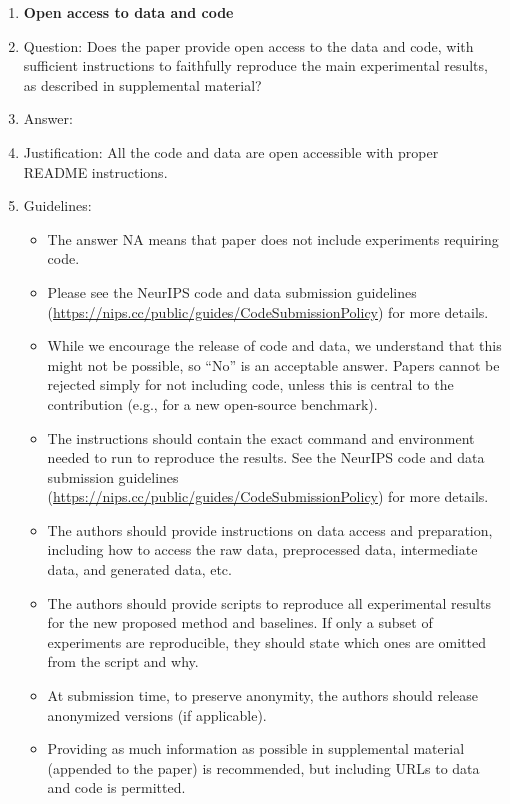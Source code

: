 \begin{enumerate}
\item {\bf Open access to data and code}
    \item[] Question: Does the paper provide open access to the data and code, with sufficient instructions to faithfully reproduce the main experimental results, as described in supplemental material?
    \item[] Answer: \answerYes{} %
    \item[] Justification: All the code and data are open accessible with proper README instructions.
    \item[] Guidelines:
    \begin{itemize}
        \item The answer NA means that paper does not include experiments requiring code.
        \item Please see the NeurIPS code and data submission guidelines (\url{https://nips.cc/public/guides/CodeSubmissionPolicy}) for more details.
        \item While we encourage the release of code and data, we understand that this might not be possible, so “No” is an acceptable answer. Papers cannot be rejected simply for not including code, unless this is central to the contribution (e.g., for a new open-source benchmark).
        \item The instructions should contain the exact command and environment needed to run to reproduce the results. See the NeurIPS code and data submission guidelines (\url{https://nips.cc/public/guides/CodeSubmissionPolicy}) for more details.
        \item The authors should provide instructions on data access and preparation, including how to access the raw data, preprocessed data, intermediate data, and generated data, etc.
        \item The authors should provide scripts to reproduce all experimental results for the new proposed method and baselines. If only a subset of experiments are reproducible, they should state which ones are omitted from the script and why.
        \item At submission time, to preserve anonymity, the authors should release anonymized versions (if applicable).
        \item Providing as much information as possible in supplemental material (appended to the paper) is recommended, but including URLs to data and code is permitted.
    \end{itemize}



\end{enumerate}
